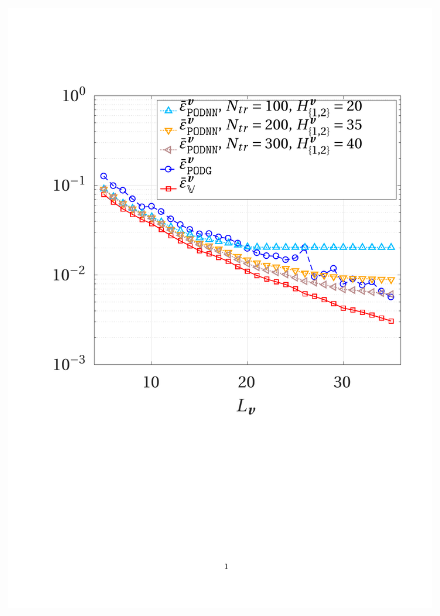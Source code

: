 \documentclass{elsarticle}
\numberwithin{equation}{section}
\theoremstyle{theorem}
\theoremstyle{definition}
\theoremstyle{remark}
\theoremstyle{proposition}
\numberwithin{figure}{section}
\begin{document}
\begin{figure}[t!]
			\includegraphics[scale = 0.4, trim = {2cm 9cm 1.5cm 3.5cm}, clip]{dc_400_vel_error_vs_rank}
			\hspace*{1cm}

\end{figure}
\end{document}
